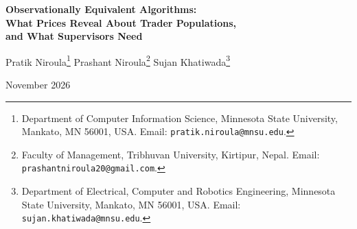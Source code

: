 \documentclass[11pt,letterpaper]{article}
\theoremstyle{definition}
\begin{document}
\hypersetup{pageanchor=false}
\thispagestyle{empty}
\begin{center}
  {\LARGE\bfseries Observationally Equivalent Algorithms:\\[4pt]
  What Prices Reveal About Trader Populations,\\[4pt]
  and What Supervisors Need\par}
  \vspace{1.2em}
  {\large Pratik Niroula\footnote{Department of Computer Information Science, Minnesota State University, Mankato, MN 56001, USA. Email: \texttt{pratik.niroula@mnsu.edu}.} \qquad
  Prashant Niroula\footnote{Faculty of Management, Tribhuvan University, Kirtipur, Nepal. Email: \texttt{prashantniroula20@gmail.com}.} \qquad
  Sujan Khatiwada\footnote{Department of Electrical, Computer and Robotics Engineering, Minnesota State University, Mankato, MN 56001, USA. Email: \texttt{sujan.khatiwada@mnsu.edu}.}}
  \vspace{0.8em}

  {\normalsize November 2026}
\end{center}

\vspace{0.6em}
\begin{abstract}
\noindent
We study markets in which heterogeneous trading algorithms feed a common public pricing signal back into order flow. In a linear market and in a stationary inventory-dealer equilibrium, every public outcome depends on the trader population only through its aggregate feedback kernel. Within one passive record of pricing errors this yields a supervisory separation. With impact and persistence held fixed, whether a uniform feedback cut meets a stability ceiling depends only on the aggregate budget, which the record estimates at a near-parametric rate however close the traders' memories are. In the dealer equilibrium the cut moves impact and persistence; on the principal equilibrium branch it still lowers the budget, and its size is learned at a slower rate that again does not depend on the spacing of memories. Whether a targeted restriction meets the ceiling can require of order $\Delta^{-(4K-2)}$ observations when $K$ classes have memory rates within $\Delta$; verified class tags, or a pilot of the restriction, remove that penalty. Cheap relabeling erodes tags, and against a fixed untagged test traders gain by crowding their memories. Class-tagged flows from the Taiwan Stock Exchange illustrate the magnitudes.
\end{abstract}
\end{document}
